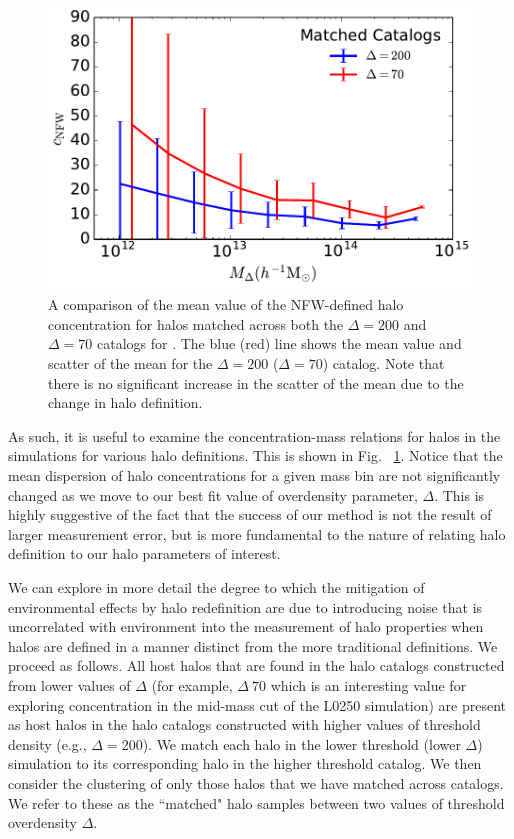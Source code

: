 \documentclass[usenatbib]{mnras}
\begin{document}
\begin{figure}
	\centering
	\includegraphics[width=.4\textwidth]{matched_catalog_cnfwcomp.pdf}
	\caption{A comparison of the mean value of the NFW-defined halo concentration for halos matched across both
	the $\Delta = 200$ and $\Delta = 70$ catalogs for \simB. The blue (red) line shows the mean value and scatter of
	the	mean for the $\Delta = 200$ ($\Delta = 70$) catalog. Note that there is no significant
	increase in the scatter of the mean due to the change in halo definition.}
	\label{fig:matched_cnfwcomp}
\end{figure}

As such, it is useful to examine the concentration-mass relations for halos in 
the simulations for various halo definitions. This is shown in Fig. ~\ref{fig:matched_cnfwcomp}. 
Notice that the mean dispersion of halo concentrations for a given mass
bin are not significantly changed as we move to our best fit value of
overdensity parameter, $\Delta$. This is highly suggestive of the fact
that the success of our method is not the result of larger measurement
error, but is more fundamental to the nature of relating halo definition to
our halo parameters of interest.

We can explore in more detail the degree to which the mitigation of environmental 
effects by halo redefinition are due to introducing noise that is uncorrelated with 
environment into the measurement of halo properties when halos are defined 
in a manner distinct from the more traditional definitions. We proceed as follows. 
All host halos that are found in the halo catalogs constructed from lower values 
of $\Delta$ (for example, $\Delta ~ 70$ which is an interesting value for exploring 
concentration in the mid-mass cut of the L0250 simulation) are present as host halos in the halo 
catalogs constructed with higher values of threshold density (e.g., $\Delta = 200$). 
We match each halo in the lower threshold (lower $\Delta$) simulation to 
its corresponding halo in the higher threshold catalog. We then consider 
the clustering of only those halos that we have matched across catalogs. 
We refer to these as the ``matched" halo samples between two values 
of threshold overdensity $\Delta$. 
\end{document}

